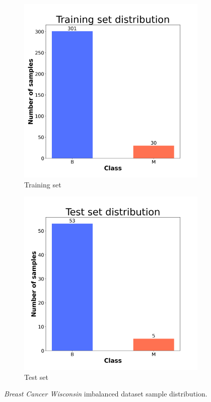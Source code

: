 \begin{figure}[H]
    \centering
    \begin{subfigure}[t]{0.45\textwidth}
        \centering
        \includegraphics[width=1\textwidth]{images/exper2/breast/train_dist.png}
        \caption{Training set}
    \end{subfigure}
    \begin{subfigure}[t]{0.45\textwidth}
        \centering
        \includegraphics[width=1\textwidth]{images/exper2/breast/test_dist.png}
        \caption{Test set}
    \end{subfigure}
    \caption{\textit{Breast Cancer Wisconsin} imbalanced dataset sample distribution.}
\end{figure}

